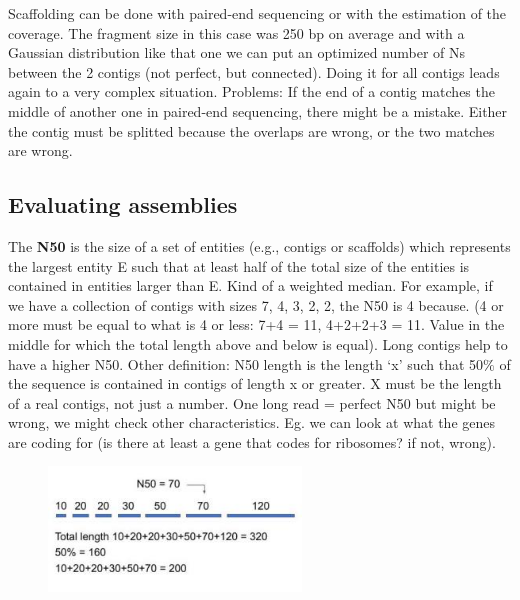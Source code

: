 Scaffolding can be done with paired-end sequencing or with the estimation of the coverage. 
The fragment size in this case was 250 bp on average and with a Gaussian distribution like that one we can put an optimized number of Ns between the 2 contigs (not perfect, but connected). 
Doing it for all contigs leads again to a very complex situation.
Problems: If the end of a contig matches the middle of another one in paired-end sequencing, there might be a mistake. Either the contig must be splitted because the overlaps are wrong, or the two matches are wrong.

\subsection{Evaluating assemblies}

The \textbf{N50} is the size of a set of entities (e.g., contigs or scaffolds) which represents the largest entity E such that at least half of the total size of the entities is contained in entities larger than E.
Kind of a weighted median. For example, if we have a collection of contigs with sizes 7, 4, 3, 2, 2, the N50 is 4 because. 
(4 or more must be equal to what is 4 or less: 7+4 = 11, 4+2+2+3 = 11. Value in the middle for which the total length above and below is equal).
Long contigs help to have a higher N50. 
Other definition: N50 length is the length ‘x’ such that 50$\%$ of the sequence is contained in contigs of length x or greater. X must be the length of a real contigs, not just a number.
One long read = perfect N50 but might be wrong, we might check other characteristics. Eg. we can look at what the genes are coding for (is there at least a gene that codes for ribosomes? if not, wrong).

\begin{figure}[h]
\centering
\includegraphics[width=0.6\textwidth]{Evalueate.png}
\caption{}
\end{figure}
